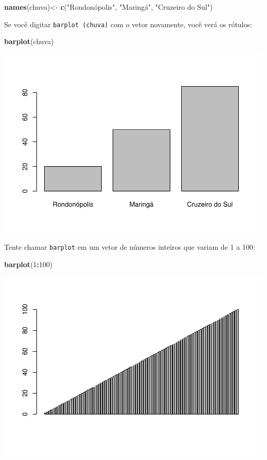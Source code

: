 \documentclass[
]{book}
\newenvironment{Shaded}{\begin{snugshade}}{\end{snugshade}}
\newcommand{\DecValTok}[1]{\textcolor[rgb]{0.00,0.00,0.81}{#1}}
\newcommand{\KeywordTok}[1]{\textcolor[rgb]{0.13,0.29,0.53}{\textbf{#1}}}
\newcommand{\NormalTok}[1]{#1}
\newcommand{\OperatorTok}[1]{\textcolor[rgb]{0.81,0.36,0.00}{\textbf{#1}}}
\newcommand{\StringTok}[1]{\textcolor[rgb]{0.31,0.60,0.02}{#1}}
\begin{document}
\begin{Shaded}
\begin{Highlighting}[]
\KeywordTok{names}\NormalTok{(chuva)<-}\StringTok{ }\KeywordTok{c}\NormalTok{(}\StringTok{"Rondonópolis", "}\NormalTok{Maringá}\StringTok{", "}\NormalTok{Cruzeiro do Sul}\StringTok{")}
\end{Highlighting}
\end{Shaded}

Se você digitar \texttt{barplot\ (chuva)} com o vetor novamente, você verá os rótulos:

\begin{Shaded}
\begin{Highlighting}[]
\KeywordTok{barplot}\NormalTok{(chuva)}
\end{Highlighting}
\end{Shaded}

\includegraphics{TudodoR_files/figure-latex/unnamed-chunk-34-1.pdf}

Tente chamar \texttt{barplot} em um vetor de números inteiros que variam de 1 a 100:

\begin{Shaded}
\begin{Highlighting}[]
\KeywordTok{barplot}\NormalTok{(}\DecValTok{1}\OperatorTok{:}\DecValTok{100}\NormalTok{)}
\end{Highlighting}
\end{Shaded}

\includegraphics{TudodoR_files/figure-latex/unnamed-chunk-35-1.pdf}
\end{document}
